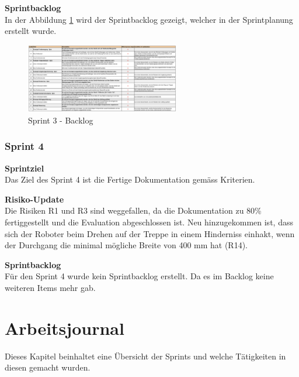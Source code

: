 \textbf{Sprintbacklog}\\
In der Abbildung \ref{fig:sprint-backlog-3} wird der Sprintbacklog gezeigt, welcher in der Sprintplanung erstellt wurde.
\begin{figure}[H]
  \includegraphics[angle=270,width=0.6\textwidth]{img/projektmanagement/sprint3-backlog2.png}
  \centering
  \caption{Sprint 3 - Backlog}
  \label{fig:sprint-backlog-3}
\end{figure}

\subsubsection{Sprint 4}
\textbf{Sprintziel}\\
Das Ziel des Sprint 4 ist die Fertige Dokumentation gemäss Kriterien.

\textbf{Risiko-Update}\\
Die Risiken R1 und R3 sind weggefallen, da die Dokumentation zu 80\% fertiggestellt und die Evaluation abgeschlossen ist. Neu hinzugekommen ist, dass sich der Roboter beim Drehen auf der Treppe in einem Hinderniss einhakt, wenn der Durchgang die minimal mögliche Breite von 400 mm hat (R14).

\textbf{Sprintbacklog}\\
Für den Sprint 4 wurde kein Sprintbacklog erstellt. Da es im Backlog keine weiteren Items mehr gab.

\section{Arbeitsjournal}
Dieses Kapitel beinhaltet eine Übersicht der Sprints und welche Tätigkeiten 
in diesen gemacht wurden.

